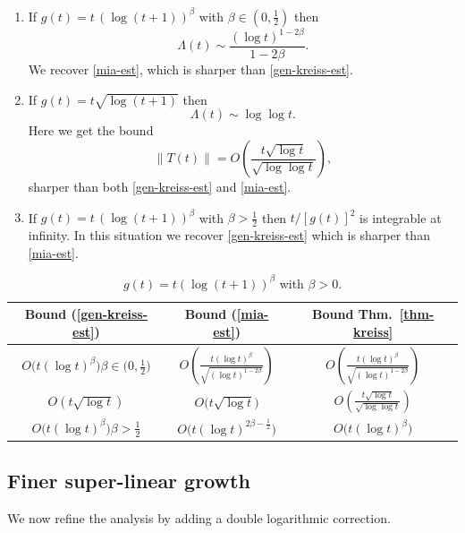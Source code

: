 \documentclass[12pt]{amsart}
\theoremstyle{plain}
\theoremstyle{definition}
\numberwithin{equation}{section}
\begin{document}
\smallskip
\begin{enumerate}

\item[$\bullet$] If $g(t)=t\, (\log(t+1))^\beta$ with $\beta\in(0,\frac{1}{2})$
then
$$
\Lambda(t) \sim \frac{(\log t)^{1-2\beta}}{1-2\beta}.
$$
We recover \eqref{mia-est}, which is sharper than \eqref{gen-kreiss-est}.

\medskip
\item[$\bullet$]
If $g(t)=t \sqrt{\log(t+1)}$ then
$$
\Lambda(t) \sim \log \log t.
$$
Here we get the bound
$$
\|T (t)\|= O\left(\frac{t \sqrt{\log t}}{\sqrt{\log \log t}}\right),
$$
sharper than both \eqref{gen-kreiss-est} and \eqref{mia-est}.

\medskip
\item[$\bullet$]
If $g(t)=t\, (\log(t+1))^{\beta}$ with $\beta>\frac12$ then
$t/[g(t)]^2$ is integrable at infinity. In this situation we recover \eqref{gen-kreiss-est}
which is sharper than \eqref{mia-est}.
\end{enumerate}

\begin{table}[htbp]
\centering
\renewcommand{\arraystretch}{2.3}
\setlength{\tabcolsep}{16pt}
\begin{tabular}{|c|c|c|}
\hline
\textbf{Bound (\ref{gen-kreiss-est})} & \textbf{Bound (\ref{mia-est})} & \textbf{Bound Thm.\ \ref{thm-kreiss}} \\
\hline\hline
$O\big(t (\log t)^\beta\big)$\quad $\beta \in \big(0,\frac12\big)$
& $O\left(\displaystyle\frac{t (\log t)^{\beta}}{\sqrt{(\log t)^{1-2\beta}}}\right)$
& $O\left(\displaystyle\frac{t (\log t)^{\beta}}{\sqrt{(\log t)^{1-2\beta}}}\right)$ \\
\hline
$O(t \sqrt{\log t})$ & $O\big(t \sqrt{\log t}\big)$
& $O\left(\displaystyle\frac{t \sqrt{\log t}}{\sqrt{\log \log t}}\right)$ \\ [1.2ex]
\hline
$O\big(t (\log t)^\beta\big)$\quad $\beta >\frac12$
& $O\big(t (\log t)^{2\beta-\frac12}\big)$ & $O\big(t (\log t)^\beta\big)$ \\
\hline
\end{tabular}
\vspace{0.25cm}
\caption{$g(t)=t(\log(t+1))^\beta$ with $\beta>0$.}
\end{table}

\subsection{Finer super-linear growth}
We now refine the analysis by adding a double logarithmic correction.
\end{document}
